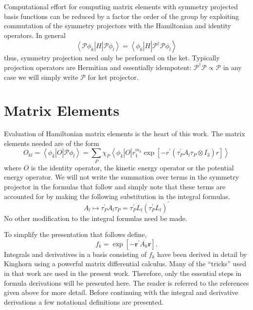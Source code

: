\documentclass[12pt]{article}
\begin{document}
Computational effort for computing matrix elements with symmetry projected
basis functions can be reduced by a factor the order of the group by
exploiting commutation of the symmetry projectors with the Hamiltonian and
identity operators. In general
\begin{equation}
\left\langle \mathcal{P}\phi_{k}\right|  H\left|  \mathcal{P}\phi
_{l}\right\rangle =\left\langle \phi_{k}\right|  H\left|  \mathcal{P}%
^{\dagger}\mathcal{P}\phi_{l}\right\rangle
\end{equation}
thus, symmetry projection need only be performed on the ket. Typically
projection operators are Hermitian and essentially idempotent: $\mathcal{P}%
^{\dagger}\mathcal{P}\varpropto\mathcal{P}$ in any case we will simply write
$\mathcal{P}$ for ket projector.

\section{Matrix Elements}

Evaluation of Hamiltonian matrix elements is the heart of this work. The
matrix elements needed are of the form
\[
O_{kl}=\left\langle \phi_{k}\right|  O\left|  \mathcal{P}\phi_{l}\right\rangle
=\sum_{P}\chi_{P}\left\langle \phi_{k}\right|  O\left|  r_{1}^{m_{k}}%
\exp\left[  -r^{\prime}\left(  \tau_{P}^{\prime}A_{l}\tau_{P}\otimes
I_{3}\right)  r\right]  \right\rangle
\]
where $O$ is the identity operator, the kinetic energy operator or the
potential energy operator. We will not write the summation over terms in the
symmetry projector in the formulas that follow and simply note that these
terms are accounted for by making the following substitution in the integral
formulas.
\begin{equation}
A_{l}\mapsto\tau_{P}^{\prime}A_{l}\tau_{P}=\tau_{P}^{\prime}L_{l}\left(
\tau_{P}^{\prime}L_{l}\right)  ^{\prime}%
\end{equation}
No other modification to the integral formulas need be made.

To simplify the presentation that follows define,
\begin{equation}
f_{k}=\exp\left[  -\mathbf{r}^{\prime}\overline{A_{k}}\mathbf{r}\right]  .
\end{equation}
Integrals and derivatives in a basis consisting of $f_{k}$ have been derived
in detail by Kinghorn\cite{Kinghorn95a,Kinghorn95b} using a powerful matrix
differential calculus. Many of the ``tricks'' used in that work are used in
the present work. Therefore, only the essential steps in formula derivations
will be presented here. The reader is referred to the references given above
for more detail. Before continuing with the integral and derivative
derivations a few notational definitions are presented.
\end{document}
